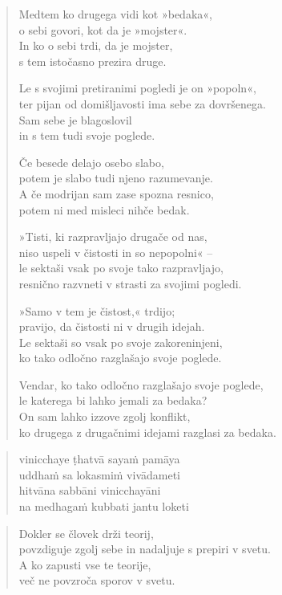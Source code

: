\clearpage
\begin{verse}

Medtem ko drugega vidi kot »bedaka«,\\
o sebi govori, kot da je »mojster«.\\
In ko o sebi trdi, da je mojster,\\
s tem istočasno prezira druge.

Le s svojimi pretiranimi pogledi je on »popoln«,\\
ter pijan od domišljavosti ima sebe za dovršenega.\\
Sam sebe je blagoslovil\\
in s tem tudi svoje poglede.

Če besede delajo osebo slabo,\\
potem je slabo tudi njeno razumevanje.\\
A če modrijan sam zase spozna resnico,\\
potem ni med misleci nihče bedak.

»Tisti, ki razpravljajo drugače od nas,\\
niso uspeli v čistosti in so nepopolni« --\\
le sektaši vsak po svoje tako razpravljajo,\\
resnično razvneti v strasti za svojimi pogledi.

»Samo v tem je čistost,« trdijo;\\
pravijo, da čistosti ni v drugih idejah.\\
Le sektaši so vsak po svoje zakoreninjeni,\\
ko tako odločno razglašajo svoje poglede.

Vendar, ko tako odločno razglašajo svoje poglede,\\
le katerega bi lahko jemali za bedaka?\\
On sam lahko izzove zgolj konflikt,\\
ko drugega z drugačnimi idejami razglasi za bedaka.

\end{verse}


\clearpage
\begin{verse}

vinicchaye ṭhatvā sayaṁ pamāya\\
uddhaṁ sa lokasmiṁ vivādameti\\
hitvāna sabbāni vinicchayāni\\
na medhagaṁ kubbati jantu loketi

\end{verse}


\clearpage
\begin{verse}

Dokler se človek drži teorij,\\
povzdiguje zgolj sebe in nadaljuje s prepiri v svetu.\\
A ko zapusti vse te teorije,\\
več ne povzroča sporov v svetu.

\end{verse}

